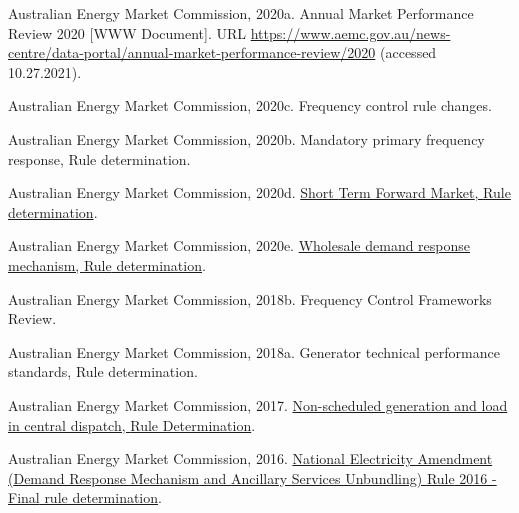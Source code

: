 \documentclass[12pt,a4paper,]{report}
\newlength{\cslhangindent}
\newenvironment{CSLReferences}[2] %
 {%
  \setlength{\parindent}{0pt}
  \ifodd #1 \everypar{\setlength{\hangindent}{\cslhangindent}}\ignorespaces\fi
  \ifnum #2 > 0
  \setlength{\parskip}{#2\baselineskip}
  \fi
 }%
 {}
\begin{document}
\begin{CSLReferences}{1}{0}
\leavevmode{}%
Australian Energy Market Commission, 2020a. Annual {Market Performance
Review} 2020 {[}WWW Document{]}. URL
\url{https://www.aemc.gov.au/news-centre/data-portal/annual-market-performance-review/2020}
(accessed 10.27.2021).

\leavevmode{}%
Australian Energy Market Commission, 2020c. Frequency control rule
changes.

\leavevmode{}%
Australian Energy Market Commission, 2020b. Mandatory primary frequency
response, {Rule} determination.

\leavevmode{}%
Australian Energy Market Commission, 2020d.
\href{https://www.aemc.gov.au/sites/default/files/documents/final_determination_-_short_term_forward_market_-_clean.pdf}{Short
{Term Forward Market}, {Rule} determination}.

\leavevmode{}%
Australian Energy Market Commission, 2020e.
\href{https://www.aemc.gov.au/sites/default/files/documents/final_determination_-_for_publication.pdf}{Wholesale
demand response mechanism, {Rule} determination}.

\leavevmode{}%
Australian Energy Market Commission, 2018b. Frequency {Control
Frameworks Review}.

\leavevmode{}%
Australian Energy Market Commission, 2018a. Generator technical
performance standards, {Rule} determination.

\leavevmode{}%
Australian Energy Market Commission, 2017.
\href{https://www.aemc.gov.au/sites/default/files/content/0bcaf68c-8449-4ce0-aaa6-da223ca6e01c/Final-Determination-ERC0203-Non-scheduled-generation-and-load.pdf}{Non-scheduled
generation and load in central dispatch, {Rule Determination}}.

\leavevmode{}%
Australian Energy Market Commission, 2016.
\href{https://www.aemc.gov.au/sites/default/files/content/68cb8114-113d-4d96-91dc-5cb4b0f9e0ae/ERC0186-DRM-and-ASU-Final-rule-determination-FINAL.PDF}{National
{Electricity Amendment} ({Demand Response Mechanism} and {Ancillary
Services Unbundling}) {Rule} 2016 - {Final} rule determination}.


\end{CSLReferences}
\end{document}

